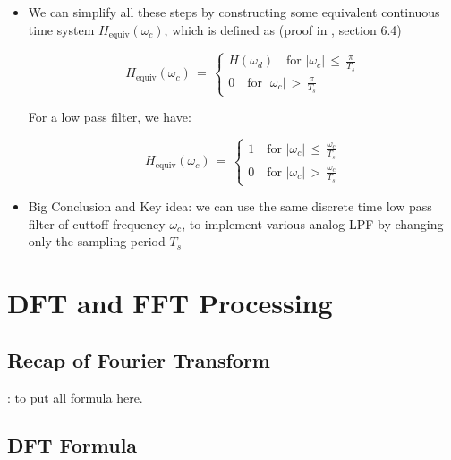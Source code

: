 \documentclass[12pt,a4paper]{book}
\begin{document}
\begin{itemize}
\item We can simplify all these steps by constructing some equivalent continuous time system $H_{\text{equiv}}(\omega_c)$, which is defined as (proof in \cite{DSP_DimitrisManolakis}, section 6.4)    

\begin{equation}
 H_{\text{equiv}}(\omega_c) \, = \, \begin{cases}
 H(\omega_d) \quad \text{for } \rvert \omega_c \lvert \, \leq \, \displaystyle\frac{\pi}{T_s} \\
 0 \quad \text{for }  \rvert \omega_c \lvert \, > \, \displaystyle\frac{\pi}{T_s}
 \end{cases}
\end{equation}

For a low pass filter, we have:

\begin{equation}
 H_{\text{equiv}}(\omega_c) \, = \, \begin{cases}
1 \quad \text{for } \rvert \omega_c \lvert \, \leq \, \displaystyle\frac{\omega_c}{T_s} \\
 0 \quad \text{for }  \rvert \omega_c \lvert \, > \, \displaystyle\frac{\omega_c}{T_s}
 \end{cases}
\end{equation}

\item Big Conclusion and Key idea: we can use the same discrete time low pass filter of cuttoff frequency $\omega_c$, to implement various analog LPF by changing only the sampling period $T_s$

\end{itemize}



\chapter{DFT and FFT Processing}


\section{Recap of Fourier Transform}

: to put all formula here.

\section{DFT Formula}
\end{document}
